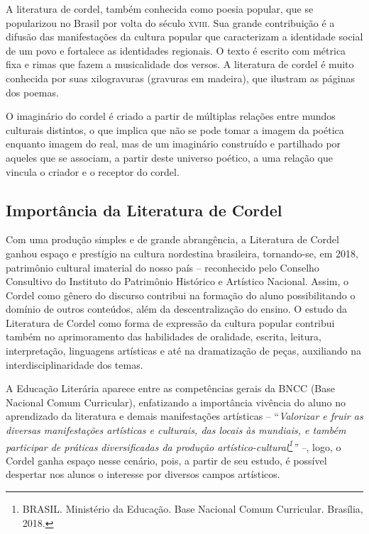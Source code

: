 \documentclass[12pt]{extarticle}
\begin{document}
A literatura de cordel, também conhecida como poesia popular, que se
popularizou no Brasil por volta do século \textsc{xviii}. Sua grande contribuição
é a difusão das manifestações da cultura popular que caracterizam a identidade
social de um povo e fortalece as identidades regionais. O texto é escrito com
métrica fixa e rimas que fazem a musicalidade dos versos. A literatura de
cordel é muito conhecida por suas xilogravuras (gravuras em madeira), que
ilustram as páginas dos poemas.

O imaginário do cordel é criado a partir de múltiplas relações entre mundos
culturais distintos, o que implica que não se pode tomar a imagem da poética
enquanto imagem do real, mas de um imaginário construído e partilhado por
aqueles que se associam, a partir deste universo poético, a uma relação que
vincula o criador e o receptor do cordel.

\subsection{Importância da Literatura de Cordel}

Com uma produção simples e de grande abrangência, a Literatura de Cordel ganhou
espaço e prestígio na cultura nordestina brasileira, tornando-se, em 2018,
patrimônio cultural imaterial do nosso país -- reconhecido pelo Conselho
Consultivo do Instituto do Patrimônio Histórico e Artístico Nacional. Assim,
o Cordel como gênero do discurso contribui na formação do aluno possibilitando
o domínio de outros conteúdos, além da descentralização do ensino. O estudo da
Literatura de Cordel como forma de expressão da cultura popular contribui
também no aprimoramento das habilidades de oralidade, escrita, leitura,
interpretação, linguagens artísticas e até na dramatização de peças, auxiliando
na interdisciplinaridade dos temas.

A Educação Literária aparece entre as competências gerais da BNCC (Base
Nacional Comum Curricular), enfatizando a importância vivência do aluno no
aprendizado da literatura e demais manifestações artísticas --
``\emph{Valorizar e fruir as diversas manifestações artísticas e culturais, das
  locais às mundiais, e também participar de práticas diversificadas da
  produção artístico-cultural\footnote{BRASIL. Ministério da Educação. Base
    Nacional Comum Curricular.  Brasília, 2018.}'' --}, logo, o Cordel ganha
    espaço nesse cenário, pois, a partir de seu estudo, é possível despertar
    nos alunos o interesse por diversos campos artísticos.
\end{document}
